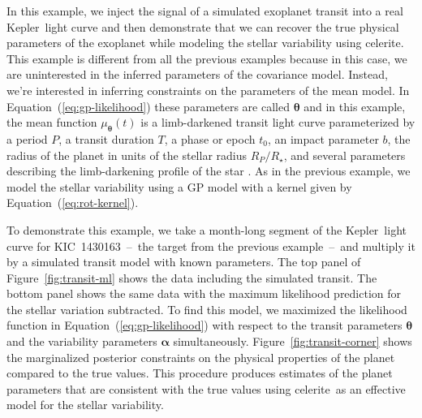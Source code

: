 \documentclass[manuscript, letterpaper]{aastex6}
\makeatletter
\let\origsubsection\subsection
\renewcommand\subsection{\@ifstar{\starsubsection}{\nostarsubsection}}
\newcommand\nostarsubsection[1]{\subsectionprelude\origsubsection{#1}}
\newcommand\starsubsection[1]{\subsectionprelude\origsubsection*{#1}}
\newcommand\subsectionprelude{\vspace{1em}}
\newcommand{\project}[1]{\textsf{#1}}
\newcommand{\kepler}{\project{Kepler}}
\newcommand{\celerite}{\project{celerite}}
\newcommand{\figureref}[1]{\ref{fig:#1}}
\newcommand{\Figure}[1]{Figure~\figureref{#1}}
\renewcommand{\eqref}[1]{\ref{eq:#1}}
\newcommand{\Eq}[1]{Equation~(\eqref{#1})}
\newcommand{\eq}[1]{\Eq{#1}}
\newcommand{\bvec}[1]{{\ensuremath{\boldsymbol{#1}}}}
\makeatother
\begin{document}
\subsection{Exoplanet transit fitting}

In this example, we inject the signal of a simulated exoplanet transit into a
real \kepler\ light curve and then demonstrate that we can recover the true
physical parameters of the exoplanet while modeling the stellar variability
using \celerite.
This example is different from all the previous examples because in this case,
we are uninterested in the inferred parameters of the covariance model.
Instead, we're interested in inferring constraints on the parameters of the
mean model.
In \eq{gp-likelihood} these parameters are called $\bvec{\theta}$ and in this
example, the mean function $\mu_\bvec{\theta}(t)$ is a limb-darkened transit
light curve \citep{Mandel:2002} parameterized by a period $P$, a transit
duration $T$, a phase or epoch $t_0$, an impact parameter $b$, the radius
of the planet in units of the stellar radius $R_P/R_\star$, and several
parameters describing the limb-darkening profile of the star \citep{Claret:2011}.
As in the previous example, we model the stellar variability using a GP model
with a kernel given by \eq{rot-kernel}.

To demonstrate this example, we take a month-long segment of the \kepler\
light curve for KIC~1430163~--~the target from the previous example~--~and
multiply it by a simulated transit model with known parameters.
The top panel of \Figure{transit-ml} shows the data including the simulated
transit.
The bottom panel shows the same data with the maximum likelihood prediction
for the stellar variation subtracted.
To find this model, we maximized the likelihood function in \eq{gp-likelihood}
with respect to the transit parameters $\bvec{\theta}$ and the variability
parameters $\bvec{\alpha}$ simultaneously.
\Figure{transit-corner} shows the marginalized posterior constraints on the
physical properties of the planet compared to the true values.
This procedure produces estimates of the planet parameters that are consistent
with the true values using \celerite\ as an effective model for the stellar
variability.
\end{document}
